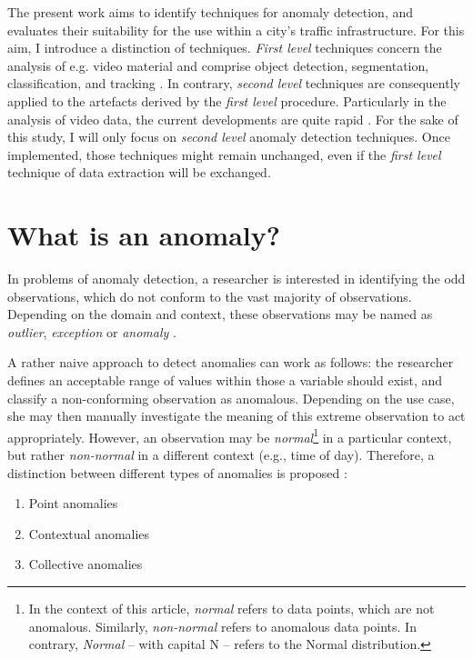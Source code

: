\documentclass[conference]{IEEEtran}
\begin{document}
The present work aims to identify techniques for anomaly detection, and evaluates their suitability for the use within a city's traffic infrastructure. For this aim, I introduce a distinction of techniques. \emph{First level} techniques concern the analysis of e.g. video material and comprise object detection, segmentation, classification, and tracking \cite{hatwar2018review}. In contrary, \emph{second level} techniques are consequently applied to the artefacts derived by the \emph{first level} procedure. Particularly in the analysis of video data, the current developments are quite rapid \cite{kavitha2017comparative}. For the sake of this study, I will only focus on \emph{second level} anomaly detection techniques. Once implemented, those techniques might remain unchanged, even if the \emph{first level} technique of data extraction will be exchanged.

\section{What is an anomaly?} \label{sec:whatisanomaly}

In problems of anomaly detection, a researcher is interested in identifying the odd observations, which do not conform to the vast majority of observations. Depending on the domain and context, these observations may be named as \emph{outlier}, \emph{exception} or \emph{anomaly} \cite{chandola2009anomaly}.

A rather naive approach to detect anomalies can work as follows: the researcher defines an acceptable range of values within those a variable should exist, and classify a non-conforming observation as anomalous. Depending on the use case, she may then manually investigate the meaning of this extreme observation to act appropriately. However, an observation may be \emph{normal}\footnote{In the context of this article, \emph{normal} refers to data points, which are not anomalous. Similarly, \emph{non-normal} refers to anomalous data points. In contrary, \emph{Normal} -- with capital N -- refers to the Normal distribution.}
in a particular context, but rather \emph{non-normal} in a different context (e.g., time of day). Therefore, a distinction between different types of anomalies is proposed \cite{chandola2009anomaly}:

\begin{enumerate}
    \item Point anomalies
    \item Contextual anomalies
    \item Collective anomalies
\end{enumerate}
\end{document}
